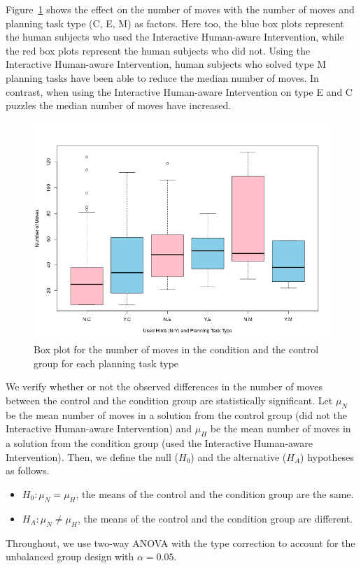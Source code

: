 Figure~\ref{fig:lenbytype} shows the effect on the number of moves with the number of moves and planning task type (C, E, M) as factors.
Here too, the blue box plots represent the human subjects who used the Interactive Human-aware Intervention, while the red box plots represent the human subjects who did not.
Using the Interactive Human-aware Intervention, human subjects who solved type M planning tasks have been able to reduce the median number of moves.
In contrast, when using the Interactive Human-aware Intervention on type E and C puzzles the median number of moves have increased.

\begin{figure}[tpb]
  \centering
\includegraphics[width=0.7\columnwidth]{img/lenbytype.png}
  \caption{Box plot for the number of moves in the condition and the control group for each planning task type}
  \label{fig:lenbytype}
\end{figure}

We verify whether or not the observed differences in the number of moves between the control and the condition group are statistically significant.
Let $\mu_N$ be the mean number of moves in a solution from the control group (did not the Interactive Human-aware Intervention) and $\mu_H$ be the mean number of moves in a solution from the condition group (used the Interactive Human-aware Intervention).
Then, we define the null ($H_0$) and the alternative ($H_A$) hypotheses as follows.
\begin{itemize}
\item $H_0: \mu_N = \mu_H$, the means of the control and the condition group are the same.
\item $H_A: \mu_N \neq \mu_H$, the means of the control and the condition group are different.
\end{itemize}
Throughout, we use two-way ANOVA with the type  correction to account for the unbalanced group design with $\alpha=0.05$.

